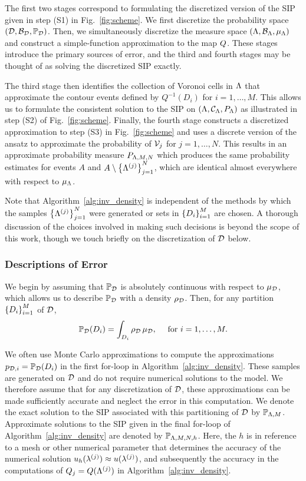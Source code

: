 The first two stages correspond to formulating the discretized version of the SIP given in step (S1) in Fig.~\ref{fig:scheme}. 
We first discretize the probability space $(\mathcal{D}, \mathcal{B}_{\mathcal{D}}, \mathbb{P}_{\mathcal{D}})$.
Then, we simultaneously discretize the measure space $({\Lambda}, \mathcal{B}_{{\Lambda}}, \mu_{{\Lambda}})$ and construct a simple-function approximation to the map $Q$.
These stages introduce the primary sources of error, and the third and fourth stages may be thought of as solving the discretized SIP exactly.

The third stage then identifies the collection of Voronoi cells in ${\Lambda}$ that approximate the contour events defined by $Q^{-1}(D_i)$ for $i=1,\hdots,M$. This allows us to formulate the consistent solution to the SIP on $({\Lambda}, \mathcal{C}_{\Lambda}, P_{\Lambda})$ as illustrated in step (S2) of Fig.~\ref{fig:scheme}. 
Finally, the fourth stage constructs a discretized approximation to step (S3) in Fig.~\ref{fig:scheme} and uses a discrete version of the ansatz to approximate the probability of $\mathcal{V}_j$ for $j=1,\dots,N$. 
This results in an approximate probability measure $P_{{\Lambda}, M, N}$ which produces the same probability estimates for events $A$ and $A\setminus \left\{ {\Lambda}^{(j)} \right\}_{j=1}^{N}$, which are identical almost everywhere with respect to $\mu_{{\Lambda}}$. 

Note that Algorithm~\ref{alg:inv_density} is independent of the methods by which the samples $\left\{ {\Lambda}^{(j)} \right\}_{j=1}^{N}$ were generated or sets in $\left\{D_i\right\}_{i=1}^{M}$ are chosen.  
A thorough discussion of the choices involved in making such decisions is beyond the scope of this work, though we touch briefly on the discretization of $\mathcal{D}$ below. 



\subsubsection{Descriptions of Error}\label{sec:error}
We begin by assuming that $\mathbb{P}_{\mathcal{D}}$ is absolutely continuous with respect to $\mu_{\mathcal{D}}$, which allows us to describe $\mathbb{P}_{\mathcal{D}}$ with a density $\rho_{\mathcal{D}}$. Then, for any partition $\left\{D_i\right\}_{i=1}^{M}$ of $\mathcal{D}$, 
\[
\mathbb{P}_{\mathcal{D}} (D_i) = \int_{D_i} \rho_{\mathcal{D}} \, \mu_{\mathcal{D}}, \quad \text{ for } i = 1, \hdots, M.
\]

We often use Monte Carlo approximations to compute the approximations $p_{\mathcal{D}, i}=\mathbb{P}_{\mathcal{D}}(D_i)$ in the first for-loop in Algorithm~\ref{alg:inv_density}. 
These samples are generated on $\mathcal{D}$ and do not require numerical solutions to the model. 
We therefore assume that for any discretization of $\mathcal{D}$, these approximations can be made sufficiently accurate and neglect the error in this computation. 
We denote the exact solution to the SIP associated with this partitioning of $\mathcal{D}$ by $\mathbb{P}_{{\Lambda}, M}$. 
Approximate solutions to the SIP given in the final for-loop of Algorithm~\ref{alg:inv_density} are denoted by $\mathbb{P}_{{\Lambda}, M, N, h}$.
Here, the $h$ is in reference to a mesh or other numerical parameter that determines the accuracy of the numerical solution $u_h(\lambda^{(j)})\approx u(\lambda^{(j)})$, and subsequently the accuracy in the computations of $Q_j = Q({\Lambda}^{(j)})$ in Algorithm~\ref{alg:inv_density}.
 
